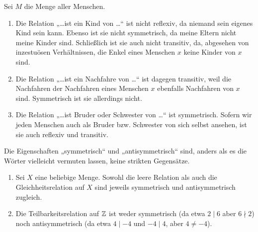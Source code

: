 \begin{bsp}
    Sei $M$ die Menge aller Menschen.
    \begin{enumerate}
        \item Die Relation „\dots ist ein Kind von \dots“ ist nicht reflexiv, da niemand sein eigenes Kind sein kann. Ebenso ist sie nicht symmetrisch, da meine Eltern nicht meine Kinder sind. Schließlich ist sie auch nicht transitiv, da, abgesehen von inzestuösen Verhältnissen, die Enkel eines Menschen $x$ keine Kinder von $x$ sind.
        \item Die Relation „\dots ist ein Nachfahre von \dots“ ist dagegen transitiv, weil die Nachfahren der Nachfahren eines Menschen $x$ ebenfalls Nachfahren von $x$ sind. Symmetrisch ist sie allerdings nicht.
        \item Die Relation „\dots ist Bruder oder Schwester von \dots“ ist symmetrisch. Sofern wir jeden Menschen auch als Bruder bzw. Schwester von sich selbst ansehen, ist sie auch reflexiv und transitiv.
    \end{enumerate}
\end{bsp}


\begin{bsp}
    Die Eigenschaften „symmetrisch“ und „antisymmetrisch“ sind, anders als es die Wörter vielleicht vermuten lassen, keine strikten Gegensätze.
    \begin{enumerate}
        \item Sei $X$ eine beliebige Menge. Sowohl die leere Relation als auch die Gleichheitsrelation auf $X$ sind jeweils symmetrisch und antisymmetrisch zugleich.
        \item Die Teilbarkeitsrelation auf $\mathbb Z$ ist weder symmetrisch (da etwa $2\mid 6$ aber $6\nmid 2$) noch antisymmetrisch (da etwa $4\mid -4$ und $-4\mid 4$, aber $4\neq -4$).
    \end{enumerate}
\end{bsp}


